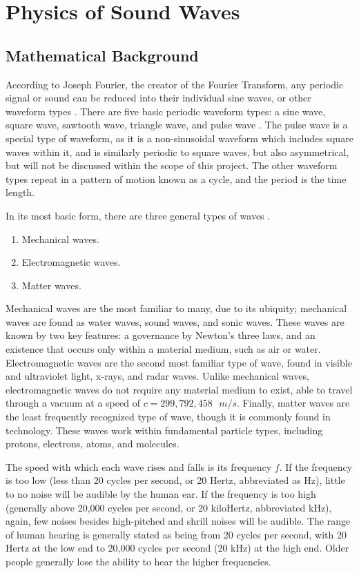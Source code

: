 \chapter{Physics of Sound Waves}\label{chapter:theory}

\section{Mathematical Background}\label{section:waveforms}
According to Joseph Fourier, the creator of the Fourier Transform, any periodic signal or sound can be reduced into their individual sine waves, or other waveform types \cite{Broughton_Bryan_2008}. There are five basic periodic waveform types: a sine wave, square wave, sawtooth wave, triangle wave, and pulse wave \cite{Winer_2018}. The pulse wave is a special type of waveform, as it is a non-sinusoidal waveform which includes square waves within it, and is similarly periodic to square waves, but also asymmetrical, but will not be discussed within the scope of this project. The other waveform types repeat in a pattern of motion known as a cycle, and the period is the time length.

In its most basic form, there are three general types of waves \cite{Halliday_Resnick_Walker_2005}.

\begin{enumerate}
	\item Mechanical waves.
	\item Electromagnetic waves.
	\item Matter waves.
\end{enumerate}

Mechanical waves are the most familiar to many, due to its ubiquity; mechanical waves are found as water waves, sound waves, and sonic waves. These waves are known by two key features: a governance by Newton's three laws, and an existence that occurs only within a material medium, such as air or water. Electromagnetic waves are the second most familiar type of wave, found in visible and ultraviolet light, x-rays, and radar waves. Unlike mechanical waves, electromagnetic waves do not require any material medium to exist, able to travel through a vacuum at a speed of $c = 299,792,458 \textrm{ } m/s$. Finally, matter waves are the least frequently recognized type of wave, though it is commonly found in technology. These waves work within fundamental particle types, including protons, electrons, atoms, and molecules. 

The speed with which each wave rises and falls is its frequency $f$. If the frequency is too low (less than 20 cycles per second, or 20 Hertz, abbreviated as Hz), little to no noise will be audible by the human ear. If the frequency is too high (generally above 20,000 cycles per second, or 20 kiloHertz, abbreviated kHz), again, few noises besides high-pitched and shrill noises will be audible. The range of human hearing is generally stated as being from 20 cycles per second, with 20 Hertz at the low end to 20,000 cycles per second (20 kHz) at the high end. Older people generally lose the ability to hear the higher frequencies.


